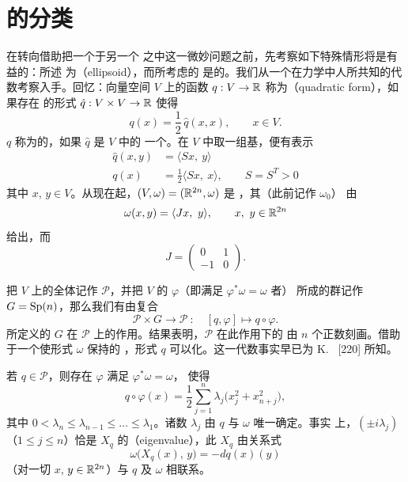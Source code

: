 

\section{\trPositiveDefinite\trQuadraticForm{}的\trSymplectic{}分类}
\label{sec:quadratic-forms-classification}

在转向借助\trSymplecticMapping{}把一个\trOpenSet{}\trEmbedding{}于另一个%
\trOpenSet{}之中这一微妙问题之前，先考察如下特殊情形将是有益的：所述%
\trOpenSet{}为\textbf{\trEllipsoid}（ellipsoid），而所考虑的\trSymplecticMapping{}%
是\trLinear{}的。我们从一个在力学中人所共知的代数考察入手。回忆：向量空间 $V$%
上的函数 $q:V\to\mathbb{R}$ 称为\textbf{\trQuadraticForm}（quadratic form），如果存在%
\trSymmetric{}的\trBilinear{}形式 $\hat{q}:V\times V\to\mathbb{R}$ 使得
\[
q(x)=\frac{1}{2}\,\hat{q}(x,x),\qquad x\in V.
\]
\trQuadraticForm{} $q$ 称为\trPositiveDefinite{}的，如果 $\hat{q}$ 是 $V$ 中的%
一个\trInnerProduct。在 $V$ 中取一组基，便有表示
\begin{align*}
\hat{q}(x,y) &= \langle Sx,\ y\rangle\\
q(x) &= \frac{1}{2}\langle Sx,\ x\rangle,\qquad S=S^{T}>0
\end{align*}
其中 $x$, $y\in V$。从现在起，$(V,\omega)=(\mathbb{R}^{2n},\omega)$ 是%
\trStandard\trSymplecticVectorSpace，其\trSymplecticForm{}（此前记作 $\omega_0$）%
由
\[
\omega(x,y)=\langle Jx,\ y\rangle,\qquad x,\ y\in\mathbb{R}^{2n}
\]
给出，而
\[
J=\begin{pmatrix}0 & 1\\ -1 & 0\end{pmatrix}.
\]

把 $V$ 上\trPositiveDefinite\trQuadraticForm{}的全体记作 $\mathcal{P}$，并把 $V$%
的\trLinear\trSymplectic\trMapping{} $\varphi$（即满足 $\varphi^{*}\omega=\omega$ 者）%
所成的群记作 $G=\operatorname{Sp}(n)$，那么我们有由复合
\[
\mathcal{P}\times G\to\mathcal{P}\ :\quad[q,\varphi]\mapsto q\circ\varphi.
\]
所定义的 $G$ 在 $\mathcal{P}$ 上的作用。结果表明，$\mathcal{P}$ 在此作用下的%
\trOrbit{}由 $n$ 个正数刻画。借助于一个使形式 $\omega$ 保持\trInvariant{}的%
\trLinear\trMapping{}，形式 $q$ 可以\trDiagonal{}化。这一代数事实早已为 K.~\trWeierstrass{} [220]%
所知。

\begin{theorem}\label{thm:quadratic-normal-form}
若 $q\in\mathcal{P}$，则存在\trLinear\trMapping{} $\varphi$ 满足 $\varphi^{*}\omega=\omega$，%
使得
\[
q\circ\varphi(x)=\frac{1}{2}\sum_{j=1}^{n}\lambda_j\bigl(x_j^{2}+x_{n+j}^{2}\bigr),
\]
其中 $0<\lambda_n\leq\lambda_{n-1}\leq\dots\leq\lambda_1$。诸数 $\lambda_j$ 由 $q$%
与 $\omega$ 唯一确定。事实%
上，$(\pm i\lambda_j)$（$1\leq j\leq n$）恰是\trLinear\trHamiltonianVectorField{}%
$X_q$ 的\textbf{\trEigenvalue}（eigenvalue），此 $X_q$ 由关系式
\[
\omega\bigl(X_q(x),\,y\bigr)=-dq(x)(y)
\]
（对一切 $x$, $y\in\mathbb{R}^{2n}$）与 $q$ 及 $\omega$ 相联系。
\end{theorem}


